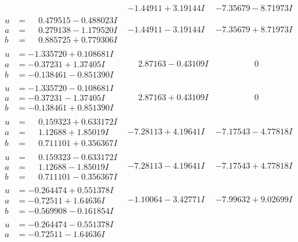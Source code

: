 \documentclass[1p]{elsarticle_modified}
\theoremstyle{definition}
\begin{document}
$$\begin{array}{c|c|c}
 & -1.44911 + 3.19144 I & -7.35679 - 8.71973 I \\ \hline\begin{aligned}
u &= \phantom{-}0.479515 - 0.488023 I \\
a &= \phantom{-}0.279138 - 1.179520 I \\
b &= \phantom{-}0.885725 + 0.779306 I\end{aligned}
 & -1.44911 - 3.19144 I & -7.35679 + 8.71973 I \\ \hline\begin{aligned}
u &= -1.335720 + 0.108681 I \\
a &= -0.37231 + 1.37405 I \\
b &= -0.138461 - 0.851390 I\end{aligned}
 & \phantom{-}2.87163 - 0.43109 I & \phantom{-0.000000 } 0 \\ \hline\begin{aligned}
u &= -1.335720 - 0.108681 I \\
a &= -0.37231 - 1.37405 I \\
b &= -0.138461 + 0.851390 I\end{aligned}
 & \phantom{-}2.87163 + 0.43109 I & \phantom{-0.000000 } 0 \\ \hline\begin{aligned}
u &= \phantom{-}0.159323 + 0.633172 I \\
a &= \phantom{-}1.12688 + 1.85019 I \\
b &= \phantom{-}0.711101 + 0.356367 I\end{aligned}
 & -7.28113 + 4.19641 I & -7.17543 - 4.77818 I \\ \hline\begin{aligned}
u &= \phantom{-}0.159323 - 0.633172 I \\
a &= \phantom{-}1.12688 - 1.85019 I \\
b &= \phantom{-}0.711101 - 0.356367 I\end{aligned}
 & -7.28113 - 4.19641 I & -7.17543 + 4.77818 I \\ \hline\begin{aligned}
u &= -0.264474 + 0.551378 I \\
a &= -0.72511 + 1.64636 I \\
b &= -0.569908 - 0.161854 I\end{aligned}
 & -1.10064 - 3.42771 I & -7.99632 + 9.02699 I \\ \hline\begin{aligned}
u &= -0.264474 - 0.551378 I \\
a &= -0.72511 - 1.64636 I \\

\end{aligned}
\end{array}$$
\end{document}
